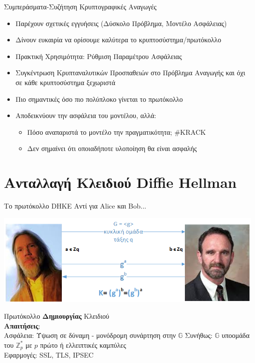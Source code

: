 \documentclass[handout]{beamer}
\begin{document}
\begin{frame}{Συμπεράσματα-Συζήτηση}
Κρυπτογραφικές Αναγωγές
\begin{itemize}
\item Παρέχουν σχετικές εγγυήσεις (Δύσκολο Πρόβλημα, Μοντέλο Ασφάλειας) \pause
\item Δίνουν ευκαιρία να ορίσουμε καλύτερα το κρυπτοσύστημα/πρωτόκολλο \pause
\item Πρακτική Χρησιμότητα: Ρύθμιση Παραμέτρου Ασφάλειας \pause
\item Συγκέντρωση Κρυπταναλυτικών Προσπαθειών στο Πρόβλημα Αναγωγής και όχι σε κάθε κρυπτοσύστημα ξεχωριστά \pause
\item Πιο σημαντικές όσο πιο πολύπλοκο γίνεται το πρωτόκολλο \pause
\item Αποδεικνύουν την ασφάλεια του μοντέλου, αλλά: 
\begin{itemize}
	\item Πόσο αναπαριστά το μοντέλο την πραγματικότητα; #KRACK \pause
	\item Δεν σημαίνει ότι οποιαδήποτε υλοποίηση θα είναι ασφαλής
\end{itemize}
\end{itemize}

\end{frame}\section{Ανταλλαγή Κλειδιού Diffie Hellman}
\begin{frame}{Το πρωτόκολλο DHKE}
Αντί για Alice και Bob... \pause
\begin{center}
\includegraphics[scale=0.45]{dh.png}
\end{center} 
\pause
Πρωτόκολλο \textbf{Δημιουργίας} Κλειδιού \\
\pause
\textbf{Απαιτήσεις}: \\
Ασφάλεια: Ύψωση σε δύναμη - μονόδρομη συνάρτηση στην $\mathbb{G}$
\pause 
Συνήθως: $\mathbb{G}$ υποομάδα του $\mathbb{Z}_p^*$ με $p$ πρώτο ή ελλειπτικές καμπύλες\\
\pause
Εφαρμογές: SSL, TLS, IPSEC
\end{frame}
\end{document}
